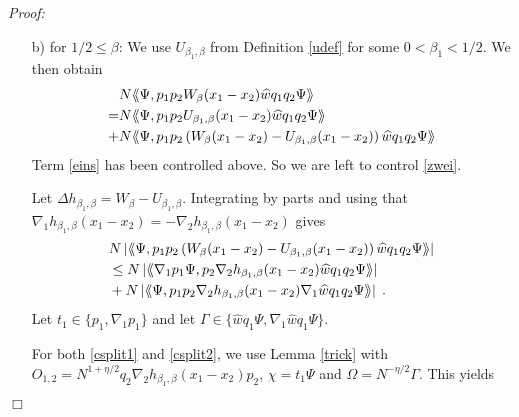 \documentclass[11pt, english, american]{article}
\newcommand{\laa}{\langle\hspace{-0.08cm}\langle}
\newcommand{\raa}{\rangle\hspace{-0.08cm}\rangle}
\newenvironment{proof}{\emph{Proof:}}{\begin{flushright} $ \Box $ \end{flushright}}
\begin{document}
\begin{proof}
\begin{enumerate}
 
\item[b)] for $1/2\leq \beta$:
We use $U_{\beta_1,\beta}$ from Definition \ref{udef} for some $0<\beta_1<1/2$.
 We then obtain
 \begin{align}
 \nonumber
&   N\laa\Psi, p_1p_2
 W_{\beta}(x_1-x_2)
  \widehat{w}q_1q_2\Psi\raa
\\ 
\label{eins}
  =&
    N\laa\Psi, p_1p_2
U_{\beta_1,\beta}(x_1-x_2)
  \widehat{w}q_1q_2\Psi\raa
  \\
  \label{zwei}
  +&
    N\laa\Psi, p_1p_2
  \left(W_{\beta}(x_1-x_2)-U_{\beta_1,\beta}(x_1-x_2)\right)
  \widehat{w}q_1q_2\Psi\raa
 \end{align}
Term \eqref{eins} has been controlled above.
So we are left to control \eqref{zwei}.

 


 
 
Let  $\Delta h_{\beta_1,\beta}=W_{\beta}-U_{\beta_1,\beta}$. Integrating by parts and using that\\ $\nabla_1 h_{\beta_1,\beta}(x_1-x_2)=-\nabla_2 h_{\beta_1,\beta}(x_1-x_2)$ gives
 \begin{align}
\nonumber
&N\left|\laa\Psi, p_1p_2\left(W_{\beta}(x_1-x_2)-U_{\beta_1,\beta}(x_1-x_2)\right)\widehat{w}q_1q_2\Psi\raa\right|
%
\\\label{csplit1}&
\leq N\left|\laa\nabla_1p_1\Psi, p_2\nabla_2 h_{\beta_1,\beta}(x_1-x_2)\widehat{w} q_1q_2\Psi\raa\right|
%
\\\label{csplit2}
&+N\left|\laa \Psi, p_1p_2\nabla_2 h_{\beta_1,\beta}(x_1-x_2) \nabla_1\widehat{w}q_1q_2\Psi\raa\right|
\;.
\end{align}
Let $ t_1 \in \lbrace p_1, \nabla_1 p_1 \rbrace$ and let
 $\Gamma \in \lbrace \widehat{w}q_1\Psi, \nabla_1 \widehat{w}q_1\Psi \rbrace$.


For both \eqref{csplit1} and \eqref{csplit2}, we use 
 Lemma \ref{trick} with 
 $O_{1,2}=N^{1+ \eta/2} q_2\nabla_2 h_{\beta_1,\beta}(x_1-x_2)p_2$, $\chi=t_1\Psi$ and
 $\Omega= N^{- \eta/2} \Gamma$. This yields
 

\end{enumerate}
\end{proof}
\end{document}
